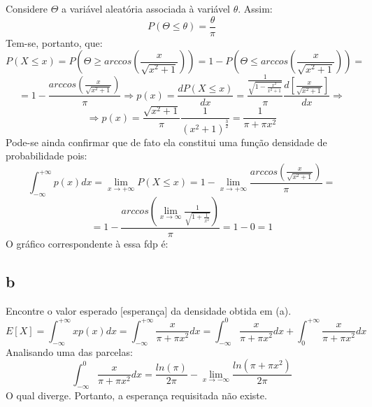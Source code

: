 \documentclass{article}[twocolumn]
\begin{document}
	Considere $\Theta$ a vari\'avel aleat\'oria associada \`a vari\'avel $\theta$.
	Assim:
	\begin{equation}
		P(\Theta \leq \theta) = \frac{\theta}{\pi}
		\nonumber
	\end{equation}
	Tem-se, portanto, que:
	\begin{equation}
		P(X \leq x) = P(\Theta \geq arccos\left(\frac{x}{\sqrt{x^{2} + 1}}\right)) =
		1 - P(\Theta \leq arccos\left(\frac{x}{\sqrt{x^{2} + 1}}\right)) =
		\nonumber
	\end{equation}
	\begin{equation}
		= 1 - \frac{arccos\left(\frac{x}{\sqrt{x^{2} + 1}}\right)}{\pi} \Rightarrow
		p(x) = \frac{d P(X \leq x)}{dx} = \frac{\frac{1}{\sqrt{1 - \frac{x^{2}}{x^{2} + 1}}}}{\pi}
		\frac{d\left[\frac{x}{\sqrt{x^{2} + 1}}\right]}{dx}
		\Rightarrow
		\nonumber
	\end{equation}
	\begin{equation}
		\Rightarrow p(x) = \frac{\sqrt{x^{2} + 1}}{\pi}\frac{1}{(x^{2} + 1)^{\frac{3}{2}}} =
		\frac{1}{\pi + \pi x^{2}}
		\nonumber
	\end{equation}
	Pode-se ainda confirmar que de fato ela constitui uma fun\c{c}\~ao densidade
	de probabilidade pois:
	\begin{equation}
		\int_{-\infty}^{+\infty}p(x)dx = \lim_{x \rightarrow +\infty}P(X \leq x) =
		1 - \lim_{x \rightarrow +\infty}\frac{arccos\left(\frac{x}{\sqrt{x^{2} + 1}}\right)}{\pi} =
		\nonumber
	\end{equation}
	\begin{equation}
		= 1 - \frac{arccos\left(\lim_{x \rightarrow \infty} \frac{1}{\sqrt{1 +
		\frac{1}{x^{2}}}}\right)}{\pi} =
		1 - 0 = 1
		\nonumber
	\end{equation}
	O gr\'afico correspondente \`a essa fdp \'e:
	\begin{center}
	\end{center}
	\subsection{b}
	Encontre o valor esperado [esperan\c{c}a] da densidade obtida em (a).
	\begin{equation}
		E[X] = \int_{-\infty}^{+\infty}xp(x)dx = \int_{-\infty}^{+\infty}\frac{x}{\pi + \pi x^{2}}dx
		= \int_{-\infty}^{0}\frac{x}{\pi + \pi x^{2}}dx +
		\int_{0}^{+\infty}\frac{x}{\pi + \pi x^{2}}dx
		\nonumber
	\end{equation}
	Analisando uma das parcelas:
	\begin{equation}
		\int_{-\infty}^{0}\frac{x}{\pi + \pi x^{2}}dx =
		\frac{ln(\pi)}{2\pi} -
		\lim_{x \rightarrow -\infty} \frac{ln(\pi + \pi x^{2})}{2\pi}
		\nonumber
	\end{equation}
	O qual diverge. Portanto, a esperan\c{c}a requisitada n\~ao existe.
\end{document}
